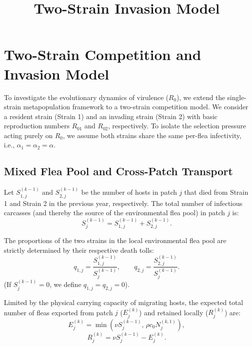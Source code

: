 \documentclass[11pt,a4paper]{article}
\title{Two-Strain Invasion Model }
\begin{document}
\maketitle



\section{Two-Strain Competition and Invasion Model}

To investigate the evolutionary dynamics of virulence ($R_0$), we extend the single-strain metapopulation framework to a two-strain competition model. We consider a resident strain (Strain 1) and an invading strain (Strain 2) with basic reproduction numbers $R_{01}$ and $R_{02}$, respectively. To isolate the selection pressure acting purely on $R_0$, we assume both strains share the same per-flea infectivity, i.e., $\alpha_1 = \alpha_2 = \alpha$.

\subsection{Mixed Flea Pool and Cross-Patch Transport}

Let $S_{1,j}^{(k-1)}$ and $S_{2,j}^{(k-1)}$ be the number of hosts in patch $j$ that died from Strain 1 and Strain 2 in the previous year, respectively. The total number of infectious carcasses (and thereby the source of the environmental flea pool) in patch $j$ is:
\begin{equation}
S_j^{(k-1)} = S_{1,j}^{(k-1)} + S_{2,j}^{(k-1)}.
\end{equation}

The proportions of the two strains in the local environmental flea pool are strictly determined by their respective death tolls:
\begin{equation}
q_{1,j} = \frac{S_{1,j}^{(k-1)}}{S_j^{(k-1)}}, \qquad q_{2,j} = \frac{S_{2,j}^{(k-1)}}{S_j^{(k-1)}}.
\end{equation}
(If $S_j^{(k-1)} = 0$, we define $q_{1,j} = q_{2,j} = 0$).

Limited by the physical carrying capacity of migrating hosts, the expected total number of fleas exported from patch $j$ ($E_j^{(k)}$) and retained locally ($R_j^{(k)}$) are:
\begin{equation}
E_j^{(k)} = \min\!\left( \nu S_j^{(k-1)},\, \rho c_0 N_j^{(k,1)} \right),
\end{equation}
\begin{equation}
R_j^{(k)} = \nu S_j^{(k-1)} - E_j^{(k)}.
\end{equation}
\end{document}

